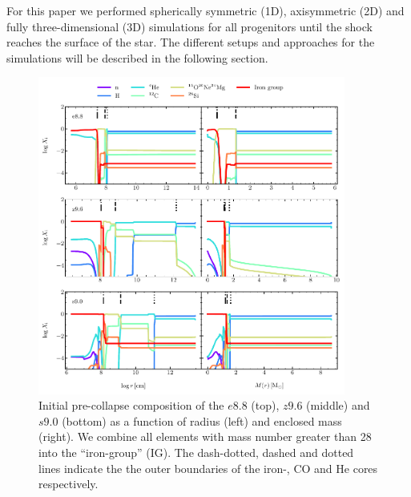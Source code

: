 \documentclass[fleqn,usenatbib]{mnras}
\begin{document}
For this paper we performed spherically symmetric (1D), axisymmetric (2D) and fully three-dimensional (3D) simulations for all progenitors until the shock reaches the surface of the star. The different setups and approaches for the simulations will be described in the following section.
\begin{figure}
 \centering
 \includegraphics[width=0.9\textwidth,trim=0cm 0.0cm 0cm 0cm,clip]{./pic/composition_all.pdf}
 \caption{Initial pre-collapse composition of the $e8.8$ (top), $z9.6$ (middle) and $s9.0$ (bottom) as a function of radius (left) and enclosed mass (right). We combine all elements with mass number greater than 28 into the ``iron-group'' (IG). The dash-dotted, dashed and dotted lines indicate the the outer boundaries of the iron-, CO and He cores respectively.}
 \label{fig:composition_all}
\end{figure}
\end{document}
